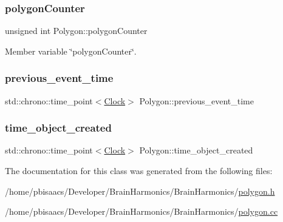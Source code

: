 \subsubsection{\texorpdfstring{polygon\+Counter}{polygonCounter}}
{\footnotesize\ttfamily unsigned int Polygon\+::polygon\+Counter\hspace{0.3cm}{\ttfamily [private]}}



Member variable \char`\"{}polygon\+Counter\char`\"{}. 

\mbox{\label{classPolygon_a46fa35a90ffcf375c8eceb2cf8a169d0}} 
\subsubsection{\texorpdfstring{previous\+\_\+event\+\_\+time}{previous\_event\_time}}
{\footnotesize\ttfamily std\+::chrono\+::time\+\_\+point$<$\mbox{\hyperlink{universe_8h_a0ef8d951d1ca5ab3cfaf7ab4c7a6fd80}{Clock}}$>$ Polygon\+::previous\+\_\+event\+\_\+time\hspace{0.3cm}{\ttfamily [private]}}

\mbox{\label{classPolygon_af5b19b47f12f4984521d6f48a45c1428}} 
\subsubsection{\texorpdfstring{time\+\_\+object\+\_\+created}{time\_object\_created}}
{\footnotesize\ttfamily std\+::chrono\+::time\+\_\+point$<$\mbox{\hyperlink{universe_8h_a0ef8d951d1ca5ab3cfaf7ab4c7a6fd80}{Clock}}$>$ Polygon\+::time\+\_\+object\+\_\+created\hspace{0.3cm}{\ttfamily [private]}}



The documentation for this class was generated from the following files\+:\begin{DoxyCompactItemize}
\item 
/home/pbisaacs/\+Developer/\+Brain\+Harmonics/\+Brain\+Harmonics/\mbox{\hyperlink{polygon_8h}{polygon.\+h}}\item 
/home/pbisaacs/\+Developer/\+Brain\+Harmonics/\+Brain\+Harmonics/\mbox{\hyperlink{polygon_8cc}{polygon.\+cc}}\end{DoxyCompactItemize}
